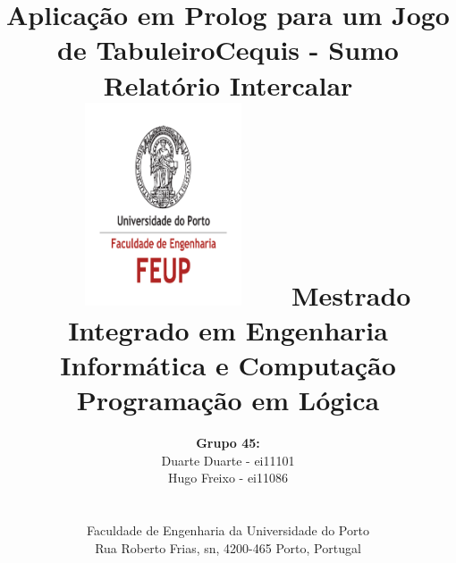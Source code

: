 \documentclass[a4paper]{article}
\begin{document}
\setlength{\textwidth}{16cm}
\setlength{\textheight}{22cm}

\title{\Huge\textbf{Aplicação em Prolog para um Jogo de Tabuleiro}\linebreak\textbf{Cequis - Sumo}\linebreak\linebreak
\Large\textbf{Relatório Intercalar}\linebreak\linebreak
\includegraphics[height=6cm, width=7cm]{feup.pdf}\linebreak \linebreak
\Large{Mestrado Integrado em Engenharia Informática e Computação} \linebreak \linebreak
\Large{Programação em Lógica}\linebreak
}

\author{\textbf{Grupo 45:}\\ Duarte Duarte - ei11101 \\ Hugo Freixo - ei11086 \\\linebreak\linebreak \\
 \\ Faculdade de Engenharia da Universidade do Porto \\ Rua Roberto Frias, s\/n, 4200-465 Porto, Portugal \linebreak\linebreak\linebreak
\linebreak\linebreak\vspace{1cm}}
\maketitle
\thispagestyle{empty}

\newpage
\end{document}
